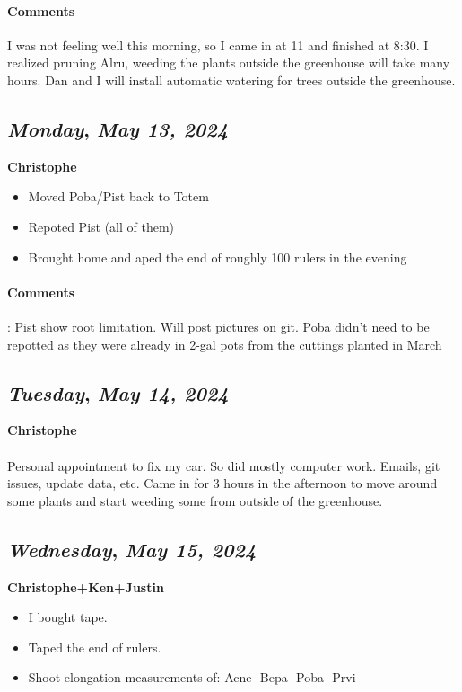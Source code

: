 \paragraph{Comments} I was not feeling well this morning, so I came in at 11 and finished at 8:30. I realized pruning Alru, weeding the plants outside the greenhouse will take many hours. Dan and I will install automatic watering for trees outside the greenhouse.

\def\day{\textit{May 13, 2024}}
\def\weekday{\textit{Monday}}
\subsection*{\weekday, \day}
\textbf{Christophe}
\begin{itemize}
    \item Moved Poba/Pist back to Totem
    \item Repoted Pist (all of them)
    \item Brought home and aped the end of roughly 100 rulers in the evening
\end{itemize}
\paragraph{Comments}: Pist show root limitation. Will post pictures on git. Poba didn’t need to be repotted as they were already in 2-gal pots from the cuttings planted in March

\def\day{\textit{May 14, 2024}}
\def\weekday{\textit{Tuesday}}
\subsection*{\weekday, \day}
\textbf{Christophe}
\paragraph{}
Personal appointment to fix my car. So did mostly computer work. Emails, git issues, update data, etc. Came in for 3 hours in the afternoon to move around some plants and start weeding some from outside of the greenhouse.

\def\day{\textit{May 15, 2024}}
\def\weekday{\textit{Wednesday}}
\subsection*{\weekday, \day}
\textbf{Christophe+Ken+Justin}
\begin{itemize}
    \item I bought tape.
    \item Taped the end of rulers.
    \item Shoot elongation measurements of:-Acne -Bepa -Poba -Prvi
\end{itemize}
